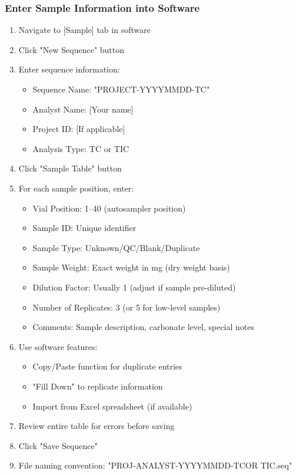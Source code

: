\documentclass[11pt,a4paper]{article}\usepackage[]{graphicx}\usepackage[]{xcolor}
\begin{document}
\subsubsection{Enter Sample Information into Software}
\begin{enumerate}[noitemsep]
    \item Navigate to [Sample] tab in software
    \item Click "New Sequence" button
    \item Enter sequence information:
    \begin{itemize}
        \item Sequence Name: "PROJECT-YYYYMMDD-TC"
        \item Analyst Name: [Your name]
        \item Project ID: [If applicable]
        \item Analysis Type: TC or TIC
    \end{itemize}
    \item Click "Sample Table" button
    \item For each sample position, enter:
    \begin{itemize}
        \item Vial Position: 1--40 (autosampler position)
        \item Sample ID: Unique identifier
        \item Sample Type: Unknown/QC/Blank/Duplicate
        \item Sample Weight: Exact weight in mg (dry weight basis)
        \item Dilution Factor: Usually 1 (adjust if sample pre-diluted)
        \item Number of Replicates: 3 (or 5 for low-level samples)
        \item Comments: Sample description, carbonate level, special notes
    \end{itemize}
    \item Use software features:
    \begin{itemize}
        \item Copy/Paste function for duplicate entries
        \item "Fill Down" to replicate information
        \item Import from Excel spreadsheet (if available)
    \end{itemize}
    \item Review entire table for errors before saving
    \item Click "Save Sequence" 
    \item File naming convention: "PROJ-ANALYST-YYYYMMDD-TCOR TIC.seq"
\end{enumerate}
\end{document}
